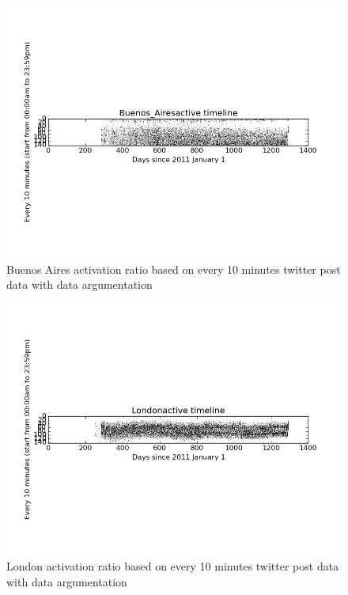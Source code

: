 \documentclass[a4paper,12pt]{article}
\begin{document}
\begin{figure}[H]
  \begin{center}
      \includegraphics[scale=0.8]{Buenos_Airesbinary3.png}
\end{center}
\caption{Buenos Aires activation ratio based on every 10 minutes twitter post data  with data argumentation}
 \label {fig:2}
 \end{figure}




\begin{figure}[H]
  \begin{center}
      \includegraphics[scale=0.8]{Londonbinary3.png}
\end{center}
\caption{London activation ratio based on every 10 minutes twitter post data  with data argumentation}
 \label {fig:2}
 \end{figure}
\end{document}
